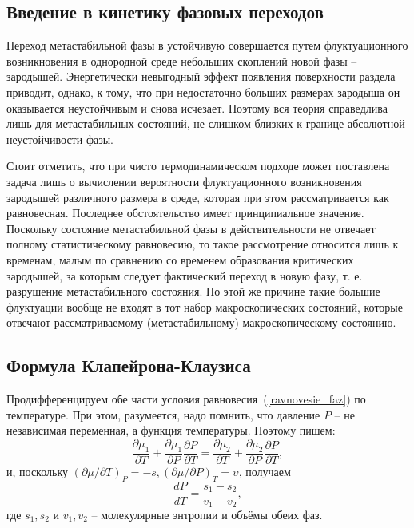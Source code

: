 \documentclass[a4paper,12pt]{article} %
\begin{document}
	
\subsection{Введение в кинетику фазовых переходов}	
	Переход метастабильной фазы в устойчивую совершается путем флуктуационного возникновения в однородной среде небольших скоплений новой фазы -- зародышей. Энергетически невыгодный эффект появления поверхности раздела приводит, однако, к тому, что при недостаточно больших размерах зародыша он оказывается неустойчивым и снова исчезает. Поэтому вся теория справедлива лишь для метастабильных состояний, не слишком близких к границе абсолютной неустойчивости фазы.
	
	Стоит отметить, что при чисто термодинамическом подходе может поставлена задача лишь о вычислении вероятности флуктуационного возникновения зародышей различного размера в среде, которая при этом рассматривается как равновесная. Последнее обстоятельство имеет принципиальное значение. Поскольку состояние метастабильной фазы в действительности не отвечает полному статистическому равновесию, то такое рассмотрение относится лишь к временам, малым по сравнению со временем образования критических зародышей, за которым следует фактический переход в новую фазу, т. е. разрушение метастабильного состояния. По этой же причине такие большие флуктуации вообще не входят в тот набор макроскопических состояний, которые отвечают рассматриваемому (метастабильному) макроскопическому состоянию.
	
\subsection{Формула Клапейрона-Клаузиса}
	Продифференцируем обе части условия равновесия~(\ref{ravnovesie_faz}) по температуре. При этом, разумеется, надо помнить, что давление $P$ -- не независимая переменная, а функция температуры. Поэтому пишем:
\begin{equation*}
	\frac{\partial \mu_1}{\partial T} + \frac{\partial \mu_1}{\partial P}\frac{\partial P}			{\partial T} = \frac{\partial \mu_2}{\partial T} + \frac{\partial \mu_2}{\partial P}			\frac{\partial P}{\partial T},
\end{equation*}
и, поскольку $(\partial \mu / \partial T)_P = -s, (\partial \mu / \partial P)_T = \upsilon$, получаем
\begin{equation}
	\frac{dP}{dT} = \frac{s_1 - s_2}{v_1 - v_2},
\end{equation}
где $s_1, s_2$ и $v_1, v_2$ -- молекулярные энтропии и объёмы обеих фаз.
\end{document}
